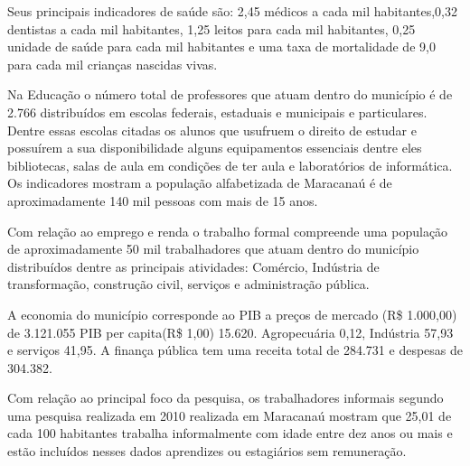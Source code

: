 Seus principais indicadores de saúde são: 2,45 médicos a cada mil habitantes,0,32 dentistas a cada mil
habitantes, 1,25 leitos para cada mil habitantes, 0,25 unidade de saúde para cada mil habitantes e uma 
taxa de mortalidade de 9,0 para cada mil crianças nascidas vivas.

Na Educação o número total de professores que atuam dentro do município é de 2.766 distribuídos em escolas federais, estaduais e municipais e particulares. Dentre essas escolas citadas os alunos que usufruem o direito de estudar e possuírem a sua disponibilidade alguns equipamentos essenciais dentre eles bibliotecas, salas de aula em condições de ter aula e laboratórios de informática. Os indicadores mostram a população alfabetizada de Maracanaú é de aproximadamente 140 mil pessoas com mais de 15 anos.

Com relação ao emprego e renda o trabalho formal compreende uma população de aproximadamente 50 mil
trabalhadores que atuam dentro do município distribuídos dentre as principais atividades: Comércio, 
Indústria de transformação, construção civil, serviços e administração pública.

A economia do município corresponde ao PIB a preços de mercado (R\$ 1.000,00) de 3.121.055 PIB per capita(R\$ 1,00) 15.620. Agropecuária 0,12, Indústria 57,93 e serviços 41,95. A finança pública tem uma receita total de 284.731 e despesas de 304.382.

Com relação ao principal foco da pesquisa, os trabalhadores informais segundo uma pesquisa realizada em 2010 realizada em Maracanaú mostram que 25,01 de cada 100 habitantes trabalha informalmente com idade entre dez anos ou mais e estão incluídos nesses dados aprendizes ou estagiários sem remuneração.